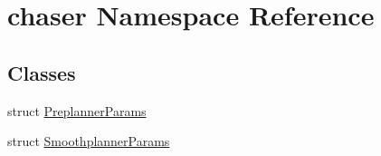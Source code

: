 \hypertarget{namespacechaser}{}\section{chaser Namespace Reference}
\label{namespacechaser}
\subsection*{Classes}
\begin{DoxyCompactItemize}
\item 
struct \hyperlink{structchaser_1_1_preplanner_params}{Preplanner\+Params}
\item 
struct \hyperlink{structchaser_1_1_smoothplanner_params}{Smoothplanner\+Params}
\end{DoxyCompactItemize}
